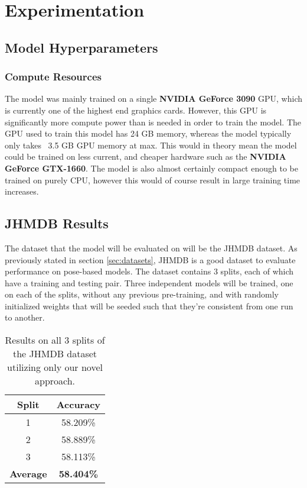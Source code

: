 
\chapter{Experimentation} %

\label{Experimentation} %

\section{Model Hyperparameters}

\subsection{Compute Resources}

The model was mainly trained on a single \textbf{NVIDIA GeForce 3090} GPU, which is currently one of the highest end graphics cards. However, this GPU is significantly more compute power than is needed in order to train the model. The GPU used to train this model has 24 GB memory, whereas the model typically only takes ~3.5 GB GPU memory at max. This would in theory mean the model could be trained on less current, and cheaper hardware such as the \textbf{NVIDIA GeForce GTX-1660}. The model is also almost certainly compact enough to be trained on purely CPU, however this would of course result in large training time increases.

\section{JHMDB Results}

The dataset that the model will be evaluated on will be the JHMDB dataset. As previously stated in section \ref{sec:datasets}, JHMDB is a good dataset to evaluate performance on pose-based models. The dataset contains 3 splits, each of which have a training and testing pair. Three independent models will be trained, one on each of the splits, without any previous pre-training, and with randomly initialized weights that will be seeded such that they're consistent from one run to another.

\begin{table}[ht]
	\centering
	\begin{tabular}{||c c||} 
		\hline
		\textbf{Split} & \textbf{Accuracy} \\ [0.5ex] 
		\hline\hline
		1 & 58.209\% \\ 
		\hline
		2 & 58.889\% \\
		\hline
		3 & 58.113\% \\
		\hline
		\hline
		\textbf{Average} & \textbf{58.404\%} \\
		\hline
	\end{tabular}
	\caption{Results on all 3 splits of the JHMDB dataset utilizing only our novel approach.}
	\label{tab:acc-results}
\end{table}

